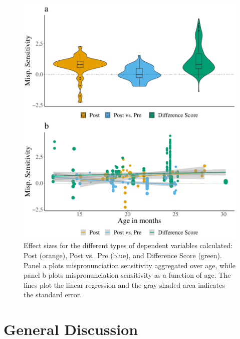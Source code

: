 \documentclass[man]{apa6}
\begin{document}
\begin{figure}
\centering
\includegraphics{VonHolzenBergmann_MPMetaAnalysis_files/figure-latex/PlotWithinCondAgeDiffScore-1.pdf}
\caption{\label{fig:PlotWithinCondAgeDiffScore}Effect sizes for the different types of dependent variables calculated: Post (orange), Post vs.~Pre (blue), and Difference Score (green). Panel a plots mispronunciation sensitivity aggregated over age, while panel b plots mispronunciation sensitivity as a function of age. The lines plot the linear regression and the gray shaded area indicates the standard error.}
\end{figure}

\hypertarget{general-discussion}{%
\section{General Discussion}\label{general-discussion}}
\end{document}
